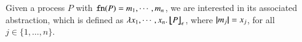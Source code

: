 \smallskip 

\noi Given a process $P$ with $\mathtt{fn}(P) = m_1, \cdots, m_n$, we are interested in its associated abstraction, which is defined as
$\lambda x_1, \cdots, x_n.\,\big\lfloor\!\!\big\lfloor P\big\rfloor\!\!\big\rfloor^{}_\epsilon$, where $|\!|m_j|\!| = x_j$, for all $j \in \{1, \ldots, n\}$. 


